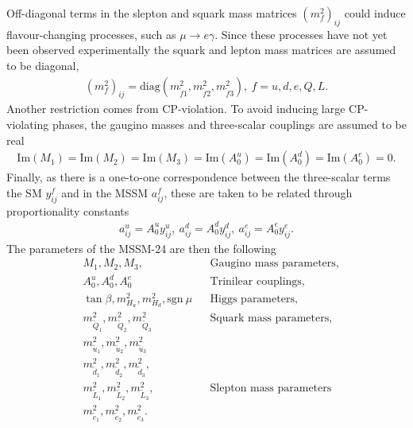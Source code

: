 \documentclass[twoside,english]{uiofysmaster}
\begin{document}
Off-diagonal terms in the slepton and squark mass matrices $(m_f^2)_{ij}$ could induce flavour-changing processes, such as $\mu \rightarrow e \gamma$. Since these processes have not yet been observed experimentally the squark and lepton mass matrices are assumed to be diagonal,
\begin{align}
(m_f^2)_{ij} = \text{diag}(m_{\tilde{f}1}^2, m_{\tilde{f}2}^2, m_{\tilde{f}3}^2), ~f = u, d, e, Q, L.
\end{align}
Another restriction comes from CP-violation. To avoid inducing large CP-violating phases, the gaugino masses and three-scalar couplings are assumed to be real
\begin{align}
\text{Im}(M_1) = \text{Im}(M_2) = \text{Im} (M_3) = \text{Im} (A_0^u) = \text{Im} (A_0^d) = \text{Im} (A_0^e) = 0.
\end{align}
Finally, as there is a one-to-one correspondence between the three-scalar terms the SM $y_{ij}^f$ and in the MSSM $a^f_{ij}$, these are taken to be related through proportionality constants
\begin{align}
a^u_{ij} = A_0^uy_{ij}^u, ~a^d_{ij} = A_0^dy_{ij}^d, ~a^e_{ij} = A_0^ey_{ij}^e.
\end{align}
 The parameters of the MSSM-24 are then the following
\begin{align}
&M_1, M_2, M_3, && \text{Gaugino mass parameters,} \nonumber \\
&A_0^u, A_0^d, A_0^e && \text{Trinilear couplings,} \nonumber\\
&\tan \beta,m_{H_u}^2,m_{H_d}^2, \text{sgn}~ \mu && \text{Higgs parameters,} \nonumber\\
& m_{\tilde{Q}_1}^2, m_{\tilde{Q}_2}^2, m_{\tilde{Q}_3}^2 && \text{Squark mass parameters,}\nonumber\\
& m_{\tilde{u}_1}^2, m_{\tilde{u}_2}^2, m_{\tilde{u}_3}^2\nonumber\\
&m_{\tilde{d}_1}^2, m_{\tilde{d}_2}^2, m_{\tilde{d}_3}^2,\nonumber\\
& m_{\tilde{L}_1}^2, m_{\tilde{L}_2}^2, m_{\tilde{L}_3}^2, &&\text{Slepton mass parameters}\nonumber\\
& m_{\tilde{e}_1}^2, m_{\tilde{e}_2}^2, m_{\tilde{e}_3}^2.\nonumber
\end{align}
%
%
\end{document}
